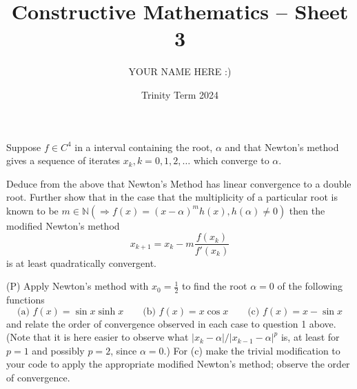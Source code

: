\documentclass[answers]{exam}
\title{Constructive Mathematics -- Sheet 3}
\author{YOUR NAME HERE :)}
\date{Trinity Term 2024}
\begin{document}
\maketitle
\begin{questions}

\question%
Suppose $f \in C^{4}$ in a interval containing the root, $\alpha$ and that Newton's method gives a sequence of iterates $x_{k}, k=0,1,2, \ldots$ which converge to $\alpha$.



\question%
Deduce from the above that Newton's Method has linear convergence to a double root. Further show that in the case that the multiplicity of a particular root is known to be $m \in \mathbb{N}\left(\Rightarrow f(x)=(x-\alpha)^{m} h(x), h(\alpha) \neq 0\right)$ then the modified Newton's method \[
	x_{k+1}=x_{k}-m \frac{f\left(x_{k}\right)}{f'\left(x_{k}\right)}
\] is at least quadratically convergent.



\question%
(P) Apply Newton's method with $x_{0}=\frac{1}{2}$ to find the root $\alpha=0$ of the following functions \[
	\text{(a) } f(x)=\sin x \sinh x\qquad
	\text{(b) } f(x)=x \cos x\qquad
	\text{(c) } f(x)=x-\sin x
\] and relate the order of convergence observed in each case to question 1 above. (Note that it is here easier to observe what $\left|x_{k}-\alpha\right| /\left|x_{k-1}-\alpha\right|^{p}$ is, at least for $p=1$ and possibly $p=2$, since $\alpha=0$.) For (c) make the trivial modification to your code to apply the appropriate modified Newton's method; observe the order of convergence.


\end{questions}
\end{document}
